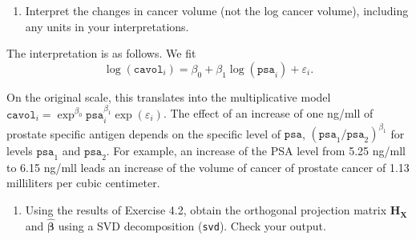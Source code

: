 \documentclass[]{book}
\newenvironment{Shaded}{\begin{snugshade}}{\end{snugshade}}
\newcommand{\CommentTok}[1]{\textcolor[rgb]{0.56,0.35,0.01}{\textit{#1}}}
\newcommand{\DataTypeTok}[1]{\textcolor[rgb]{0.13,0.29,0.53}{#1}}
\newcommand{\KeywordTok}[1]{\textcolor[rgb]{0.13,0.29,0.53}{\textbf{#1}}}
\newcommand{\NormalTok}[1]{#1}
\newcommand{\OperatorTok}[1]{\textcolor[rgb]{0.81,0.36,0.00}{\textbf{#1}}}
\newcommand{\OtherTok}[1]{\textcolor[rgb]{0.56,0.35,0.01}{#1}}
\newcommand{\StringTok}[1]{\textcolor[rgb]{0.31,0.60,0.02}{#1}}
\providecommand{\tightlist}{%
  \setlength{\itemsep}{0pt}\setlength{\parskip}{0pt}}
\theoremstyle{definition}
\theoremstyle{definition}
\theoremstyle{definition}
\theoremstyle{remark}
\begin{document}
\begin{enumerate}
\def\labelenumi{\alph{enumi}.}
\setcounter{enumi}{6}
\tightlist
\item
  Interpret the changes in cancer volume (not the log cancer volume),
  including any units in your interpretations.
\end{enumerate}

The interpretation is as follows. We fit
\[\log(\texttt{cavol}_i) = \beta_0 + \beta_1 \log(\texttt{psa}_i) + \varepsilon_i.\]

On the original scale, this translates into the multiplicative model
\(\texttt{cavol}_i= \exp^{\beta_0}\texttt{psa}_i^{\beta_1}\exp(\varepsilon_i)\).
The effect of an increase of one ng/mll of prostate specific antigen
depends on the specific level of \(\texttt{psa}\),
\((\texttt{psa}_1/\texttt{psa}_2)^{\beta_1}\) for levels
\(\texttt{psa}_1\) and \(\texttt{psa}_2\). For example, an increase of
the PSA level from 5.25 ng/mll to 6.15 ng/mll leads an increase of the
volume of cancer of prostate cancer of 1.13 milliliters per cubic
centimeter.

\begin{enumerate}
\def\labelenumi{\alph{enumi}.}
\setcounter{enumi}{7}
\tightlist
\item
  Using the results of Exercise 4.2, obtain the orthogonal projection
  matrix \(\mathbf{H}_{\mathbf{X}}\) and \(\hat{\boldsymbol{\beta}}\)
  using a SVD decomposition (\texttt{svd}). Check your output.
\end{enumerate}

\begin{Shaded}
\end{Shaded}
\end{document}
